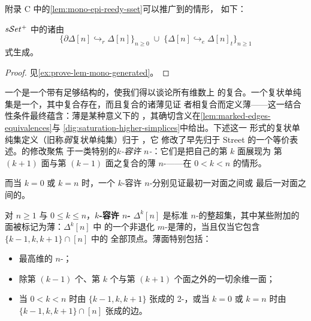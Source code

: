 附录 C 中的\cref{lem:mono-epi-reedy-sset}可以推广到\trMarkedSimplicialSet{}的情形，
如下：

\begin{lemma}\label{lem:mono-marked-cellularly-generated}
$s\mathcal{S}et^{+}$ 中的诸\trMonomorphism{}由
\[
\{\partial\Delta[n]\hookrightarrow_{r}\Delta[n]\}_{n\ge 0}
\;\cup\;
\{\Delta[n]\hookrightarrow_{e}\Delta[n]_{t}\}_{n\ge 1}
\]
\trCell{}式生成。
\end{lemma}

\begin{proof}
见\cref{ex:prove-lem-mono-generated}。
\end{proof}

一个\trMarkedSimplicialSet{}是一个带有足够结构的\trSimplicialSet{}，使我们得以谈论所有维数上\trSimplex{}%
的复合。一个复状单纯集是一个\trMarkedSimplicialSet{}，其中复合存在，而且复合的诸薄见证
者相复合而定义薄\trSimplex{}——这一结合性条件最终蕴含：薄\trSimplex{}是某种意义下的%
\trEquivalence，其确切含义在\cref{lem:marked-edges-equivalences}与%
\cref{dig:saturation-higher-simplices}中给出。下述这一
形式的复状单纯集定义（旧称\emph{弱}复状单纯集）归于 \trVerity{} \cite{bib129}，它
修改了早先归于 Street \cite{bib120} 的一个等价表述。\trVerity{}的修改聚焦
于一类特别的\emph{$k$-容许 $n$-\trSimplex{}}：它们是把自己的第 $k$ 面展现为
第 $(k+1)$ 面与第 $(k-1)$ 面之复合的薄 $n$-\trSimplex{}——在 $0<k<n$ 的情形。

而当 $k=0$ 或 $k=n$ 时，一个 $k$-容许 $n$-\trSimplex{}分别见证最初一对面之间或
最后一对面之间的\trEquivalence。

\begin{definition}[$k$-容许 $n$-\trSimplex{}]\label{def:k-admissible-simplex}
对 $n\ge 1$ 与 $0\le k\le n$，\textbf{$k$-容许 $n$-\trSimplex{}} $\Delta^{k}[n]$
是标准 $n$-\trSimplex{}的整超集，其中某些附加的面被标记为薄：$\Delta^{k}[n]$ 中
的一个非退化 $m$-\trSimplex{}是薄的，当且仅当它包含 $\{k-1,k,k+1\}\cap[n]$ 中的
全部顶点。薄面特别包括：
\begin{itemize}
\item 最高维的 $n$-\trSimplex{}；
\item 除第 $(k-1)$ 个、第 $k$ 个与第 $(k+1)$ 个面之外的一切余维一面；
\item 当 $0<k<n$ 时由 $\{k-1,k,k+1\}$ 张成的 2-\trSimplex{}，或当 $k=0$ 或 $k=n$ 时由 $\{k-1,k,k+1\}\cap[n]$ 张成的边。
\end{itemize}
\end{definition}

